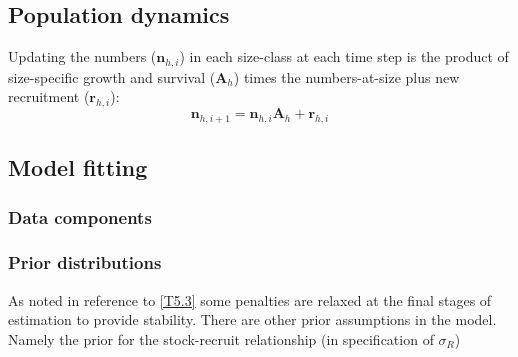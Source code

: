 \documentclass[12pt,letterpaper]{article}
\begin{document}

    \subsection*{Population dynamics} %
    \label{sub:population_dynamics}
    Updating the numbers ($\bm{n}_{h,i}$) in each size-class at each time step is the product of size-specific growth and survival ($\bm{A}_h$) times the numbers-at-size plus new recruitment ($\bm{r}_{h,i}$):
    \begin{equation}\label{eq:update_numbers_at_size}
      \bm{n}_{h,i+1} = \bm{n}_{h,i} \bm{A}_h + \bm{r}_{h,i}
    \end{equation}

       
    \subsection*{Model fitting} %
    \label{sub:Model fitting}
    \subsubsection*{Data components}
    \label{subsub:Data components}
    \subsubsection*{Prior distributions}
    \label{subsub:Prior distributions}
    As noted in reference to \eqref{T5.3} some penalties are relaxed at the final stages of estimation to provide stability. There are other prior assumptions in the model. Namely the prior for the stock-recruit relationship (in specification of $\sigma_{R}$)
\end{document}
